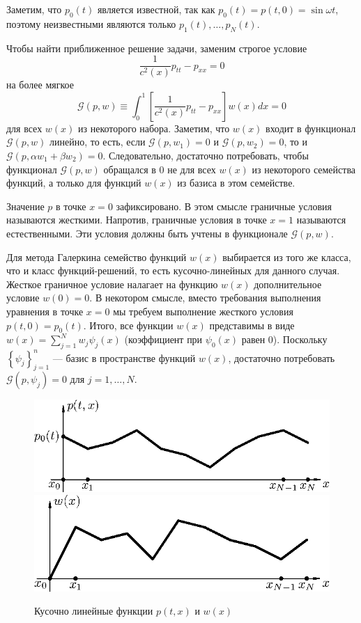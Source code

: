 \documentclass[12pt]{article}
\begin{document}
Заметим, что $p_0(t)$ является известной, так как $p_0(t) = p(t, 0) = \sin
\omega t$, поэтому неизвестными являются только $p_1(t), \dots, p_N(t)$.

Чтобы найти приближенное решение задачи, заменим строгое условие
\[
\frac{1}{c^2(x)} p_{tt} - p_{xx} = 0
\]
на более мягкое
\[
\mathcal{G}(p, w) \equiv \int_0^1 \left[\frac{1}{c^2(x)} p_{tt} - p_{xx}\right]
w(x) dx = 0
\]
для всех $w(x)$ из некоторого набора. Заметим, что $w(x)$ входит в функционал
$\mathcal{G}(p, w)$ линейно, то есть, если $\mathcal{G}(p, w_1) = 0$ и
$\mathcal{G}(p, w_2) = 0$, то и $\mathcal{G}(p, \alpha w_1 + \beta w_2) = 0$.
Следовательно, достаточно потребовать, чтобы функционал $\mathcal{G}(p, w)$
обращался в $0$ не для всех $w(x)$ из некоторого семейства функций, а только для
функций $w(x)$ из базиса в этом семействе.

Значение $p$ в точке $x = 0$ зафиксировано. В этом смысле граничные условия
называются жесткими. Напротив, граничные условия в точке $x = 1$ называются
естественными. Эти условия должны быть учтены в функционале $\mathcal{G}(p, w)$.

Для метода Галеркина семейство функций $w(x)$ выбирается из того же класса, что
и класс функций-решений, то есть кусочно-линейных для данного случая. Жесткое
граничное условие налагает на функцию $w(x)$ дополнительное условие $w(0) = 0$.
В некотором смысле, вместо требования выполнения уравнения в точке $x = 0$ мы
требуем выполнение жесткого условия $p(t, 0) = p_0(t)$. Итого, все функции
$w(x)$ представимы в виде $w(x) = \sum_{j=1}^N w_j \psi_j(x)$ (коэффициент при
$\psi_0(x)$ равен $0$). Поскольку $\left\{\psi_j\right\}_{j = 1}^n$ --- базис в
пространстве функций $w(x)$, достаточно потребовать $\mathcal{G}(p, \psi_j) = 0$
для $j = 1, \dots, N$.

\begin{figure}[!ht]
\centering
\includegraphics[width=.45\textwidth]{func-0.eps}\quad
\includegraphics[width=.45\textwidth]{func-1.eps}
\caption{Кусочно линейные функции $p(t,x)$ и $w(x)$}
\end{figure}
\end{document}
